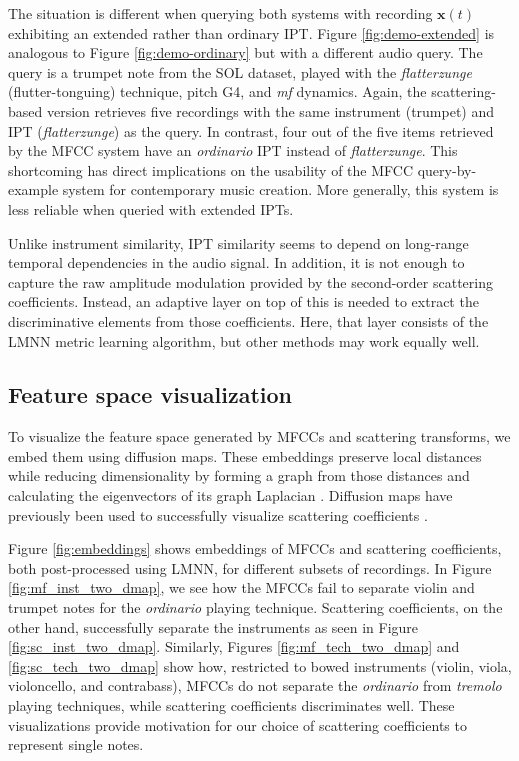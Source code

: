 The situation is different when querying both systems with recording $\boldsymbol{x}(t)$ exhibiting an extended rather than ordinary IPT.
Figure \ref{fig:demo-extended} is analogous to Figure \ref{fig:demo-ordinary} but with a different audio query.
The query is a trumpet note from the SOL dataset, played with the \emph{flatterzunge} (flutter-tonguing) technique, pitch G4, and \emph{mf} dynamics.
Again, the scattering-based version retrieves five recordings with the same instrument (trumpet) and IPT (\emph{flatterzunge}) as the query.
In contrast, four out of the five items retrieved by the MFCC system have an \emph{ordinario} IPT instead of \emph{flatterzunge}.
This shortcoming has direct implications on the usability of the MFCC query-by-example system for contemporary music creation.
More generally, this system is less reliable when queried with extended IPTs.

Unlike instrument similarity, IPT similarity seems to depend on long-range temporal dependencies in the audio signal.
In addition, it is not enough to capture the raw amplitude modulation provided by the second-order scattering coefficients.
Instead, an adaptive layer on top of this is needed to extract the discriminative elements from those coefficients.
Here, that layer consists of the LMNN metric learning algorithm, but other methods may work equally well.

\subsection{Feature space visualization}

To visualize the feature space generated by MFCCs and scattering transforms, we embed them using diffusion maps.
These embeddings preserve local distances while reducing dimensionality by forming a graph from those distances and calculating the eigenvectors of its graph Laplacian \cite{lafon2006acha}.
Diffusion maps have previously been used to successfully visualize scattering coefficients \cite{chudacek2014embc,villoutreix2017plos}.

Figure \ref{fig:embeddings} shows embeddings of MFCCs and scattering coefficients, both post-processed using LMNN, for different subsets of recordings.
In Figure \ref{fig:mf_inst_two_dmap}, we see how the MFCCs fail to separate violin and trumpet notes for the \emph{ordinario} playing technique.
Scattering coefficients, on the other hand, successfully separate the instruments as seen in Figure \ref{fig:sc_inst_two_dmap}.
Similarly, Figures \ref{fig:mf_tech_two_dmap} and \ref{fig:sc_tech_two_dmap} show how, restricted to bowed instruments (violin, viola, violoncello, and contrabass), MFCCs do not separate the \emph{ordinario} from \emph{tremolo} playing techniques, while scattering coefficients discriminates well.
These visualizations provide motivation for our choice of scattering coefficients to represent single notes.

